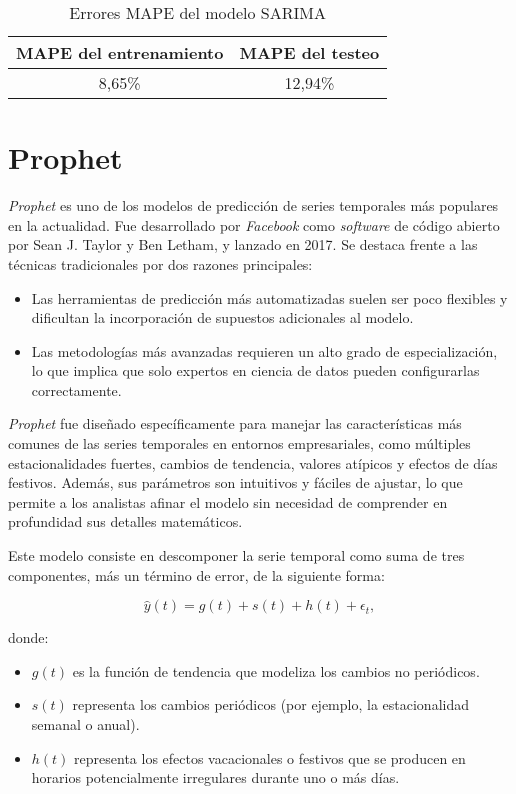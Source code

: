 \documentclass[12pt,twoside]{article}
\begin{document}
\begin{table}[h]
\centering
\begin{tabular}{cc}
\hline
\textbf{MAPE del entrenamiento} & \textbf{MAPE del testeo} \\ \hline
8,65\% & 12,94\% \\ \hline
\end{tabular}
\caption{Errores MAPE del modelo SARIMA}
\label{tab:error1.2}
\end{table}


\newpage
\section{Prophet}\label{sec:1}

\textit{Prophet} \cite{prophet1} es uno de los modelos de predicción de series temporales más populares en la actualidad. Fue desarrollado por \textit{Facebook} como \textit{software} de código abierto por Sean J. Taylor y Ben Letham, y lanzado en 2017. Se destaca frente a las técnicas tradicionales por dos razones principales:

\begin{itemize}
    \item Las herramientas de predicción más automatizadas suelen ser poco flexibles y dificultan la incorporación de supuestos adicionales al modelo.
    \item Las metodologías más avanzadas requieren un alto grado de especialización, lo que implica que solo expertos en ciencia de datos pueden configurarlas correctamente.
\end{itemize}

\textit{Prophet} fue diseñado específicamente para manejar las características más comunes de las series temporales en entornos empresariales, como múltiples estacionalidades fuertes, cambios de tendencia, valores atípicos y efectos de días festivos. Además, sus parámetros son intuitivos y fáciles de ajustar, lo que permite a los analistas afinar el modelo sin necesidad de comprender en profundidad sus detalles matemáticos.

Este modelo consiste en descomponer la serie temporal como suma de tres componentes, más un término de error, de la siguiente forma:

\begin{equation}
\hat{y}(t) = g(t) + s(t) + h(t) + \epsilon_t,
\end{equation}

donde:

\begin{itemize}
    \item $g(t)$ es la función de tendencia que modeliza los cambios no periódicos.
    \item $s(t)$ representa los cambios periódicos (por ejemplo, la estacionalidad semanal o anual).
    \item $h(t)$ representa los efectos vacacionales o festivos que se producen en horarios potencialmente irregulares durante uno o más días.
\end{itemize}
\end{document}
